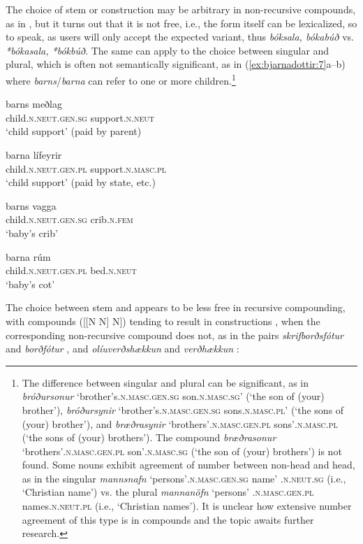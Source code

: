 \documentclass[output=paper]{LSP/langsci}
\begin{document}
The choice of stem or  construction may be arbitrary in non-recursive compounds, as in , but it turns out that it is not free, i.e., the form itself can be lexicalized, so to speak, as users will only accept the expected variant, thus \textit{bóksala, bókabúð} vs. \textit{*bókasala, *bókbúð}. The same can apply to the choice between  singular and plural, which is often not semantically significant, as in (\ref{ex:bjarnadottir:7}a–b) where \textit{barns}/\textit{barna} can refer to one or more children.\footnote{The difference between  singular and plural can be significant, as in \textit{bróðursonur} `brother's\textsc{.n.masc.gen.sg} son\textsc{.n.masc.sg}' (`the son of (your) brother'), \textit{bróðursynir} `brother's\textsc{.n.masc.gen.sg} sons\textsc{.n.masc.pl}' (`the sons of (your) brother'), and \textit{bræðrasynir} `brothers'\textsc{.n.masc.gen.pl} sons'\textsc{.n.masc.pl} (`the sons of (your) brothers'). The compound \textit{bræðrasonur} `brothers'\textsc{.n.masc.gen.pl} son'\textsc{.n.masc.sg} (`the son of (your) brothers') is not found. Some nouns exhibit agreement of number between non-head and head, as in the singular \textit{mannsnafn} `persons'\textsc{.n.masc.gen.sg} name' \textsc{.n.neut.sg} (i.e., `Christian name') vs. the plural \textit{mannanöfn} `persons' \textsc{.n.masc.gen.pl} names\textsc{.n.neut.pl} (i.e., `Christian names'). It is unclear how extensive number agreement of this type is in compounds and the topic awaits further research.}


\ea%
 \label{ex:bjarnadottir:7} 
\ea
\gll barns meðlag\\
child\textsc{.n.neut.gen.sg} support\textsc{.n.neut}\\
\glt ‘child support’ (paid by parent)

\ex
\gll barna lífeyrir\\
child\textsc{.n.neut.gen.pl} support\textsc{.n.masc.pl}\\
\glt ‘child support’ (paid by state, etc.)

\ex
\gll  barns vagga\\
child\textsc{.n.neut.gen.sg} crib\textsc{.n.fem}\\
\glt ‘baby’s crib’

\ex
\gll  barna rúm\\
child\textsc{.n.neut.gen.pl} bed\textsc{.n.neut}\\
\glt ‘baby’s cot’
\z
\z

The choice between stem and  appears to be less free in recursive compounding, with  compounds ([[N N] N]) tending to result in  constructions \citep{Jónsson1984}, when the corresponding non-recursive compound does not, as in the pairs \textit{skrifborðsfótur}  and \textit{borðfótur} , and \textit{olíuverðshækkun}  and \textit{verðhækkun} :
\end{document}
